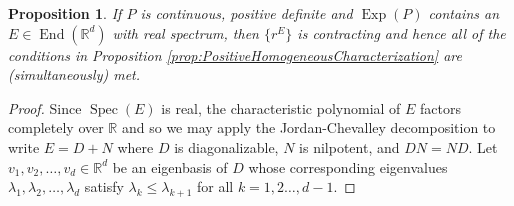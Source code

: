 \documentclass[11pt, letter]{book}
\newtheorem{proposition}[theorem]{Proposition}
\newcommand\End{\operatorname{End}} %
\newcommand\Exp{\operatorname{Exp}}
\newcommand\Spec{\operatorname{Spec}}
\newcommand\R{\mathbb{R}}
\begin{document}
\begin{framed}
\begin{proposition}\label{prop:PosHomSufficientCondition}
If $P$ is continuous, positive definite and $\Exp(P)$ contains an $E\in\End(\mathbb{R}^d)$ with real spectrum, then $\{r^E\}$ is contracting and hence all of the conditions in Proposition \ref{prop:PositiveHomogeneousCharacterization} are (simultaneously) met. 
\end{proposition}
\end{framed}
\begin{proof}
Since $\Spec(E)$ is real, the characteristic polynomial of $E$ factors completely over $\R$ and so we may apply the Jordan-Chevalley decomposition to write $E=D+N$ where $D$ is diagonalizable, $N$ is nilpotent, and $DN=ND$. Let $v_1,v_2,\dots,v_d \in \R^d$ be an eigenbasis of $D$ whose corresponding eigenvalues $\lambda_1,\lambda_2,\dots,\lambda_d$ satisfy $\lambda_k\leq \lambda_{k+1}$ for all $k=1,2\dots,d-1$.


\end{proof}
\end{document}
